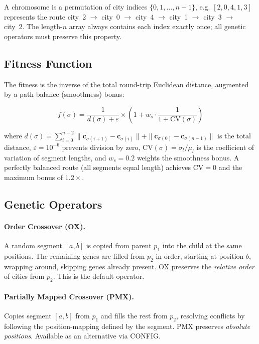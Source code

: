 \documentclass[12pt,a4paper]{article}
\begin{document}
A chromosome is a permutation of city indices $\{0, 1, \ldots, n{-}1\}$, e.g. $[2, 0, 4, 1, 3]$ represents the route city~2 $\to$ city~0 $\to$ city~4 $\to$ city~1 $\to$ city~3 $\to$ city~2. The length-$n$ array always contains each index exactly once; all genetic operators must preserve this property.

\subsection{Fitness Function}

The fitness is the inverse of the total round-trip Euclidean distance, augmented by a path-balance (smoothness) bonus:

\begin{equation}
f(\sigma) = \frac{1}{d(\sigma) + \varepsilon} \times \left(1 + w_s \cdot \frac{1}{1 + \mathrm{CV}(\sigma)}\right)
\label{eq:tsp_fitness}
\end{equation}

where $d(\sigma) = \sum_{i=0}^{n-2} \|\mathbf{c}_{\sigma(i+1)} - \mathbf{c}_{\sigma(i)}\| + \|\mathbf{c}_{\sigma(0)} - \mathbf{c}_{\sigma(n-1)}\|$ is the total distance, $\varepsilon = 10^{-6}$ prevents division by zero, $\mathrm{CV}(\sigma) = \sigma_l / \mu_l$ is the coefficient of variation of segment lengths, and $w_s = 0.2$ weights the smoothness bonus. A perfectly balanced route (all segments equal length) achieves $\mathrm{CV} = 0$ and the maximum bonus of $1.2\times$.

\subsection{Genetic Operators}

\paragraph{Order Crossover (OX).}
A random segment $[a, b]$ is copied from parent $p_1$ into the child at the same positions. The remaining genes are filled from $p_2$ in order, starting at position $b$, wrapping around, skipping genes already present. OX preserves the \emph{relative order} of cities from $p_2$. This is the default operator.

\paragraph{Partially Mapped Crossover (PMX).}
Copies segment $[a, b]$ from $p_1$ and fills the rest from $p_2$, resolving conflicts by following the position-mapping defined by the segment. PMX preserves \emph{absolute positions}. Available as an alternative via CONFIG.
\end{document}
